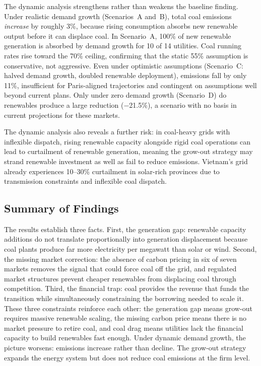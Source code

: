 \documentclass[review,3p,authoryear]{elsarticle}
\begin{document}
The dynamic analysis strengthens rather than weakens the baseline finding. Under realistic demand growth (Scenarios~A and~B), total coal emissions \textit{increase} by roughly 3\%, because rising consumption absorbs new renewable output before it can displace coal. In Scenario~A, 100\% of new renewable generation is absorbed by demand growth for 10 of 14 utilities. Coal running rates rise toward the 70\% ceiling, confirming that the static 55\% assumption is conservative, not aggressive. Even under optimistic assumptions (Scenario~C: halved demand growth, doubled renewable deployment), emissions fall by only 11\%, insufficient for Paris-aligned trajectories and contingent on assumptions well beyond current plans. Only under zero demand growth (Scenario~D) do renewables produce a large reduction ($-$21.5\%), a scenario with no basis in current projections for these markets.

The dynamic analysis also reveals a further risk: in coal-heavy grids with inflexible dispatch, rising renewable capacity alongside rigid coal operations can lead to curtailment of renewable generation, meaning the grow-out strategy may strand renewable investment as well as fail to reduce emissions. Vietnam's grid already experiences 10--30\% curtailment in solar-rich provinces due to transmission constraints and inflexible coal dispatch.

\subsection{Summary of Findings}

The results establish three facts. First, the generation gap: renewable capacity additions do not translate proportionally into generation displacement because coal plants produce far more electricity per megawatt than solar or wind. Second, the missing market correction: the absence of carbon pricing in six of seven markets removes the signal that could force coal off the grid, and regulated market structures prevent cheaper renewables from displacing coal through competition. Third, the financial trap: coal provides the revenue that funds the transition while simultaneously constraining the borrowing needed to scale it. These three constraints reinforce each other: the generation gap means grow-out requires massive renewable scaling, the missing carbon price means there is no market pressure to retire coal, and coal drag means utilities lack the financial capacity to build renewables fast enough. Under dynamic demand growth, the picture worsens: emissions increase rather than decline. The grow-out strategy expands the energy system but does not reduce coal emissions at the firm level.
\end{document}

